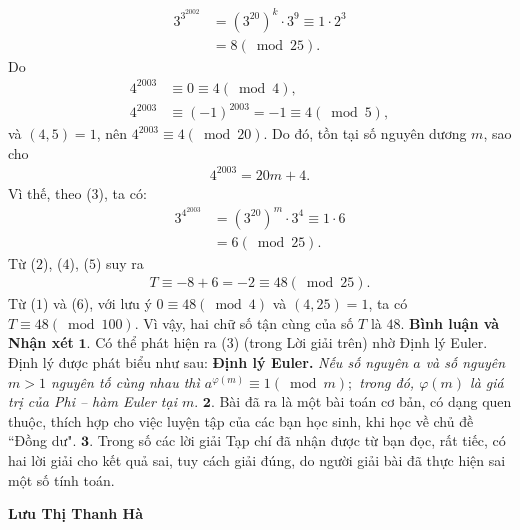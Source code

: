 \begin{multicols}{2}
	\begin{align*}
			{3^{{3^{2002}}}} &= {\left( {{3^{20}}} \right)^k} \cdot {3^9} \equiv 1 \cdot 2^3 \\
		&= 8\left({\bmod 25} \right). \tag{$4$}
	\end{align*}
	Do
	\begin{align*}
		{4^{2003}} &\equiv 0 \equiv 4\left( {\bmod 4} \right),\\
		{4^{2003}} &\equiv {\left( { - 1} \right)^{2003}} =  - 1 \equiv 4\left( {\bmod 5} \right),
	\end{align*}
	và $(4, 5) = 1$, nên ${4^{2003}} \equiv 4\left( {\bmod 20} \right)$.  Do đó, tồn tại số nguyên dương $m$, sao cho
	\begin{align*}
		{4^{2003}} = 20m + 4.
	\end{align*}
	Vì thế, theo ($3$), ta có:
	\begin{align*}
		{3^{{4^{2003}}}} &= {\left( {{3^{20}}} \right)^m} \cdot {3^4} \equiv 1 \cdot 6 \\
		&= 6\left( {\bmod 25} \right). \tag{$5$}
	\end{align*}
	Từ ($2$), ($4$), ($5$) suy ra
	\begin{align*}
		T \equiv  - 8 + 6 =  - 2 \equiv 48\left( {\bmod 25} \right). \tag{$6$}
	\end{align*}
	Từ ($1$) và ($6$), với lưu ý $0 \equiv 48\left( {\bmod 4} \right)$ và $(4, 25) = 1$, ta có  $T \equiv 48\left( {\bmod 100} \right)$.
	\vskip 0.05cm
	Vì vậy, hai chữ số tận cùng của số $T$ là $48$.
	\vskip 0.05cm
	\columnbreak
	\textbf{\color{thachthuctoanhoc}Bình luận và Nhận xét}
	\vskip 0.05cm
	$\pmb{1.}$ Có thể phát hiện ra ($3$) (trong Lời giải trên) nhờ Định lý Euler. Định lý được phát biểu như sau:
	\vskip 0.05cm
	\textbf{\color{thachthuctoanhoc}Định lý Euler.} \textit{Nếu số nguyên $a$ và số nguyên $m > 1$ nguyên tố cùng nhau thì  ${a^{\varphi \left( m \right)}} \equiv 1\left( {\bmod m} \right);$ trong đó, $\varphi \left( m \right)$  là giá trị của Phi -- hàm Euler tại $m$}.
	\vskip 0.05cm
	$\pmb{2.}$ Bài đã ra là một bài toán cơ bản, có dạng quen thuộc, thích hợp cho việc luyện tập của các bạn học sinh, khi học về chủ đề ``Đồng dư".
	\vskip 0.05cm
	$\pmb{3.}$ Trong số các lời giải Tạp chí đã nhận được từ bạn đọc, rất tiếc, có hai lời giải cho kết quả sai, tuy cách giải đúng, do người giải bài đã thực hiện sai một số tính toán.
	\begin{flushright}
		\textbf{\color{thachthuctoanhoc}Lưu Thị Thanh Hà}
	\end{flushright}
	{}

\end{multicols}
